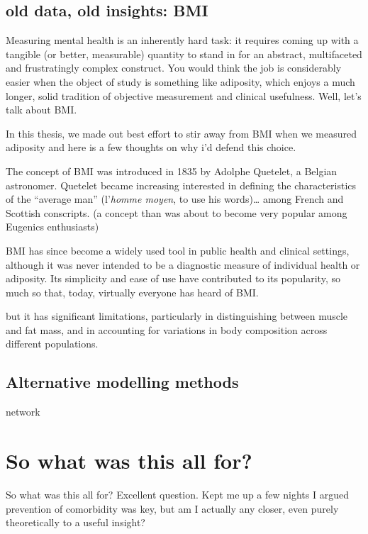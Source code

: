 \documentclass[
  letterpaper,
  DIV=11,
  numbers=noendperiod]{scrreport}
\begin{document}
\subsection{old data, old insights:
BMI}\label{old-data-old-insights-bmi}

Measuring mental health is an inherently hard task: it requires coming
up with a tangible (or better, measurable) quantity to stand in for an
abstract, multifaceted and frustratingly complex construct. You would
think the job is considerably easier when the object of study is
something like adiposity, which enjoys a much longer, solid tradition of
objective measurement and clinical usefulness. Well, let's talk about
BMI.

In this thesis, we made out best effort to stir away from BMI when we
measured adiposity and here is a few thoughts on why i'd defend this
choice.

The concept of BMI was introduced in 1835 by Adolphe Quetelet, a Belgian
astronomer. Quetelet became increasing interested in defining the
characteristics of the ``average man'' (l'\emph{homme moyen}, to use his
words)\ldots{} among French and Scottish conscripts. (a concept than was
about to become very popular among Eugenics enthusiasts)

BMI has since become a widely used tool in public health and clinical
settings, although it was never intended to be a diagnostic measure of
individual health or adiposity. Its simplicity and ease of use have
contributed to its popularity, so much so that, today, virtually
everyone has heard of BMI.

but it has significant limitations, particularly in distinguishing
between muscle and fat mass, and in accounting for variations in body
composition across different populations.

\subsection{Alternative modelling
methods}\label{alternative-modelling-methods-1}

network

\section{So what was this all for?}\label{so-what-was-this-all-for}

So what was this all for? Excellent question. Kept me up a few nights I
argued prevention of comorbidity was key, but am I actually any closer,
even purely theoretically to a useful insight?
\end{document}
